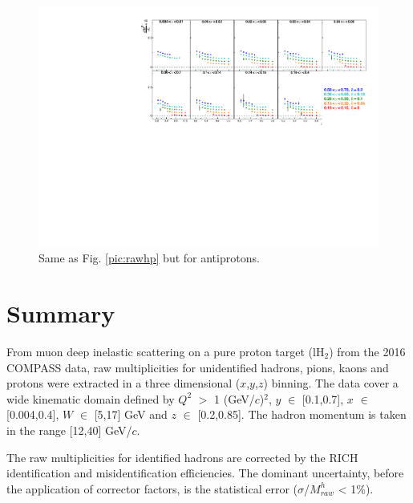 \begin{figure}[!h]
  \includegraphics[scale=0.85]{./gfx/rawpm.pdf}
  \caption{Same as Fig. \ref{pic:rawhp} but for antiprotons.}
  \label{pic:rawpm}
\end{figure}

\section{Summary}

From muon deep inelastic scattering on a pure proton target (lH$_2$) from the 2016 COMPASS data, raw multiplicities for unidentified hadrons, pions, kaons and protons were extracted in a three dimensional ($x$,$y$,$z$) binning. The data cover a wide kinematic domain defined by $Q^2$ $>$ 1 (GeV/$c$)$^2$, $y$ $\in$ [0.1,0.7], $x$ $\in$ [0.004,0.4], $W$ $\in$ [5,17] GeV and $z$ $\in$ [0.2,0.85]. The hadron momentum is taken in the range [12,40] GeV/$c$.

The raw multiplicities for identified hadrons are corrected by the RICH identification and misidentification efficiencies. The dominant uncertainty, before the application of corrector factors, is the statistical error ($\sigma$/$M^h_{raw}$ < 1\%).
